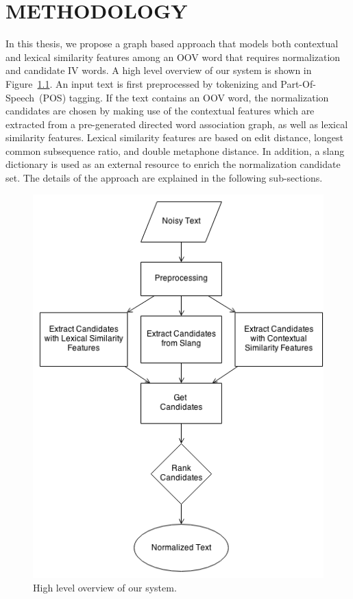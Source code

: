\documentclass[a4paper,onesided,12pt]{report}
\begin{document}
\chapter{METHODOLOGY}
\label{chapter:method}



In this thesis, we propose a graph based approach that models both contextual and lexical similarity features among an OOV word that requires normalization and candidate IV words. A high level overview of our system is shown in Figure~\ref{fig:overview}. An input text is first preprocessed by tokenizing and Part-Of-Speech~(POS) tagging. If the text contains an OOV word, the normalization candidates are chosen by making use of the contextual features which are extracted from a pre-generated directed word association graph, as well as lexical similarity features. Lexical similarity features are based on edit distance, longest common subsequence ratio, and double metaphone distance. In addition, a slang dictionary is used as an external resource to enrich the normalization candidate set. The details of the approach are explained in the following sub-sections.

\begin{figure}[htb]
\begin{center}
\includegraphics[scale=0.6]{fig/overview}
\caption{High level overview of our system.}
\label{fig:overview}
\end{center}
\end{figure}
\end{document}
